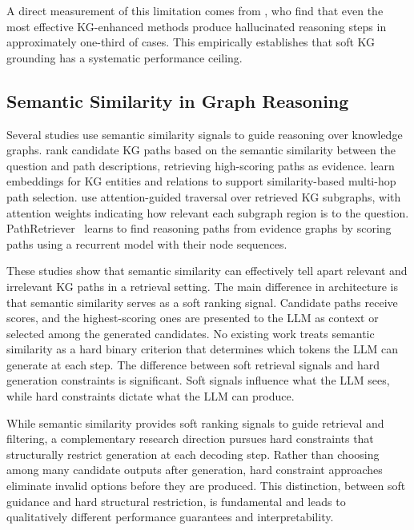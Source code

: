 A direct measurement of this limitation comes from \citet{luo2025-graph-constrained-reasoning}, who find that even the most effective KG-enhanced methods produce hallucinated reasoning steps in approximately one-third of cases. This empirically establishes that soft KG grounding has a systematic performance ceiling.

\subsection{Semantic Similarity in Graph Reasoning}

Several studies use semantic similarity signals to guide reasoning over knowledge graphs. \citet{shi2021kgpath} rank candidate KG paths based on the semantic similarity between the question and path descriptions, retrieving high-scoring paths as evidence. \citet{saxena2022kgqa} learn embeddings for KG entities and relations to support similarity-based multi-hop path selection. \citet{he2021multihop} use attention-guided traversal over retrieved KG subgraphs, with attention weights indicating how relevant each subgraph region is to the question. PathRetriever~\citep{asai2019learning} learns to find reasoning paths from evidence graphs by scoring paths using a recurrent model with their node sequences.

These studies show that semantic similarity can effectively tell apart relevant and irrelevant KG paths in a retrieval setting. The main difference in architecture is that semantic similarity serves as a soft ranking signal. Candidate paths receive scores, and the highest-scoring ones are presented to the LLM as context or selected among the generated candidates. No existing work treats semantic similarity as a hard binary criterion that determines which tokens the LLM can generate at each step. The difference between soft retrieval signals and hard generation constraints is significant. Soft signals influence what the LLM sees, while hard constraints dictate what the LLM can produce.

While semantic similarity provides soft ranking signals to guide retrieval and filtering, a complementary research direction pursues hard constraints that structurally restrict generation at each decoding step. Rather than choosing among many candidate outputs after generation, hard constraint approaches eliminate invalid options before they are produced. This distinction, between soft guidance and hard structural restriction, is fundamental and leads to qualitatively different performance guarantees and interpretability.

